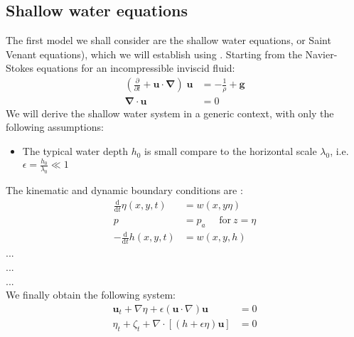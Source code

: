 \documentclass[11pt,a4paper]{article}
\begin{document}
		\subsection{Shallow water equations}
			The first model we shall consider are the shallow water equations, or Saint 
			Venant equations), which we will establish using \cite{JMC2013}. Starting from 
			the Navier-Stokes equations for an incompressible inviscid fluid: 
			\begin{align}
						\displaystyle (\frac{\partial}{\partial t} + \mathbf{u} \cdot \mathbf{\nabla}) \; \mathbf{u} & = \displaystyle -\frac{1}{\rho} + \mathbf{g} \\
						\mathbf{\nabla} \cdot \mathbf{u} & = 0 
			\end{align}
			We will derive the shallow water system in a generic context, with only the following assumptions:
			\begin{itemize}
				\item The typical water depth $h_0$ is small compare to the horizontal scale $\lambda_0$, i.e. $\epsilon = \frac{h_0}{\lambda_0} \ll 1 $
			\end{itemize}
			The kinematic and dynamic boundary conditions are : 
			\begin{align}
				\frac{\mathrm{d}}{\mathrm{d} t} \eta(x,y,t) & = w(x,y \eta) \\
				p & = p_a \: \: \:  \: \: \: \mathrm{for} \: z=\eta \\ 
				-\frac{\mathrm{d}}{\mathrm{d}t} h(x,y,t) & = w(x,y,h)
			\end{align}
			...\\
			...\\
			...\\
			 We finally obtain the following system: 
			\begin{align}
				\mathbf{u}_t + \nabla\eta + \epsilon (\mathbf{u} \cdot \nabla) \mathbf{u} &= 0 \label{SWE1}\\
				\eta_t + \zeta_t + \nabla \cdot [(h+\epsilon \eta) \mathbf{u}] &= 0 \label{SWE2}
			\end{align}						

			\pagebreak
			
\end{document}
